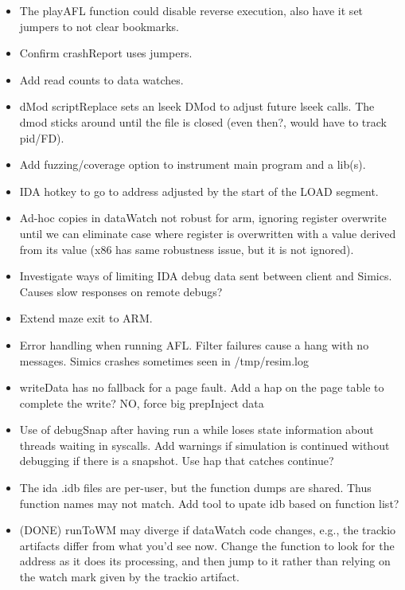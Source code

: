 \documentclass[titlepage]{article}
\begin{document}
\begin{appendices}
\begin{itemize}
\item The playAFL function could disable reverse execution, also have it set jumpers to not clear bookmarks.

\item Confirm crashReport uses jumpers.

\item Add read counts to data watches.

\item dMod scriptReplace sets an lseek DMod to adjust future lseek calls.  The dmod sticks around until the file is closed (even then?, would 
have to track pid/FD).

\item Add fuzzing/coverage option to instrument main program and a lib(s).

\item IDA hotkey to go to address adjusted by the start of the LOAD segment.

\item Ad-hoc copies in dataWatch not robust for arm, ignoring register overwrite until we can eliminate case where register is overwritten
with a value derived from its value (x86 has same robustness issue, but it is not ignored).

\item Investigate ways of limiting IDA debug data sent between client and Simics.  Causes slow responses on remote debugs?

\item Extend maze exit to ARM.

\item Error handling when running AFL.  Filter failures cause a hang with no messages.  Simics crashes sometimes seen in /tmp/resim.log

\item writeData has no fallback for a page fault.  Add a hap on the page table to complete the write?  NO, force big prepInject data

\item Use of debugSnap after having run a while loses state information about threads waiting in syscalls.  Add warnings if simulation is
continued without debugging if there is a snapshot.  Use hap that catches continue?

\item The ida .idb files are per-user, but the function dumps are shared.  Thus function names may not match.  Add tool to upate idb based
on function list?

\item (DONE) runToWM may diverge if dataWatch code changes, e.g., the trackio artifacts differ from what you'd see now.  Change the function to
look for the address as it does its processing, and then jump to it rather than relying on the watch mark  given by the trackio artifact.
\end{itemize}


\end{appendices}
\end{document}
